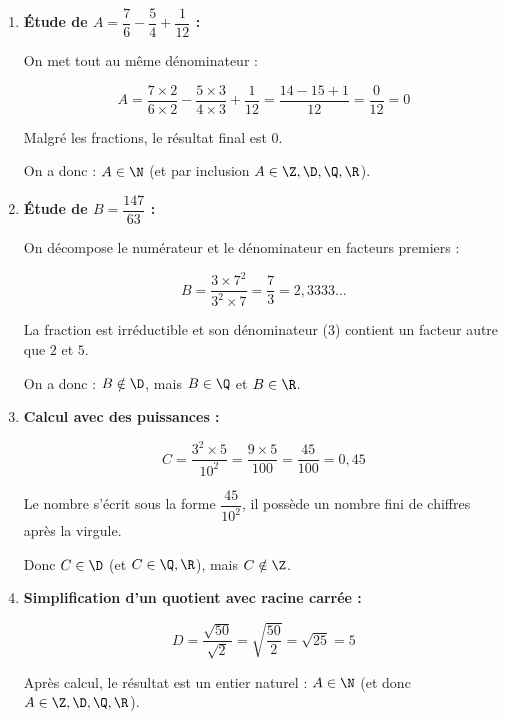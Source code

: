 \begin{ex}
	\nline
	\begin{enumerate}
		\item \textbf{Étude de $A = \dfrac{7}{6} - \dfrac{5}{4} + \dfrac{1}{12}$ :}

		      On met tout au même dénominateur :

		      \[
			      A = \frac{7 \times 2}{6 \times 2} - \frac{5 \times 3}{4 \times 3} + \frac{1}{12} = \frac{14 - 15 + 1}{12} = \frac{0}{12} = 0
		      \]

		      Malgré les fractions, le résultat final est $0$.

		      On a donc : $A \in \N$ (et par inclusion $A \in \Z, \D, \Q, \R$).

		\item \textbf{Étude de $B = \dfrac{147}{63}$ :}

		      On décompose le numérateur et le dénominateur en facteurs premiers :

		      \[
			      B = \frac{3 \times 7^2}{3^2 \times 7} = \frac{7}{3} = 2{,}3333\dots
		      \]

		      La fraction est irréductible et son dénominateur ($3$) contient un facteur autre que $2$ et $5$.

		      On a donc : $B \notin \D$, mais $B \in \Q$ et $B \in \R$.

		\item \textbf{Calcul avec des puissances :}

		      \[
			      C = \frac{3^2 \times 5}{10^2} = \frac{9 \times 5}{100} = \frac{45}{100} = 0{,}45
		      \]

		      Le nombre s'écrit sous la forme $\dfrac{45}{10^2}$, il possède un nombre fini de chiffres après la virgule.

		      Donc $C \in \D$ (et $C \in \Q, \R$), mais $C \notin \Z$.

		\item \textbf{Simplification d'un quotient avec racine carrée :}

		      \[
			      D = \frac{\sqrt{50}}{\sqrt{2}} = \sqrt{\frac{50}{2}} = \sqrt{25} = 5
		      \]

		      Après calcul, le résultat est un entier naturel : $A \in \N$ (et donc $A \in \Z, \D, \Q, \R$).

	\end{enumerate}
\end{ex}

